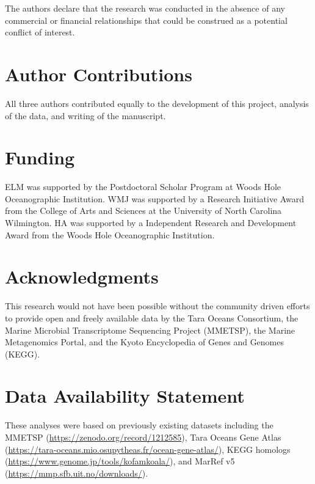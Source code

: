 \documentclass[utf8]{frontiersSCNS} %
\begin{document}
The authors declare that the research was conducted in the absence of any commercial or financial relationships that could be construed as a potential conflict of interest.

\section*{Author Contributions}
All three authors contributed equally to the development of this project, analysis of the data, and writing of the manuscript.

\section*{Funding}
ELM was supported by the Postdoctoral Scholar Program at Woods Hole Oceanographic Institution. WMJ was supported by a Research Initiative Award from the College of Arts and Sciences at the University of North Carolina Wilmington. HA was supported by a Independent Research and Development Award from the Woods Hole Oceanographic Institution. 

\section*{Acknowledgments}
This research would not have been possible without the community driven efforts to provide open and freely available data by the Tara Oceans Consortium, the Marine Microbial Transcriptome Sequencing Project (MMETSP), the Marine Metagenomics Portal, and the Kyoto Encyclopedia of Genes and Genomes (KEGG).  
\section*{Data Availability Statement}
These analyses were based on previously existing datasets including the MMETSP (\url{https://zenodo.org/record/1212585}), Tara Oceans Gene Atlas (\url{https://tara-oceans.mio.osupytheas.fr/ocean-gene-atlas/}), KEGG homologs (\url{https://www.genome.jp/tools/kofamkoala/}), and MarRef v5 (\url{https://mmp.sfb.uit.no/downloads/}). 




\end{document}
